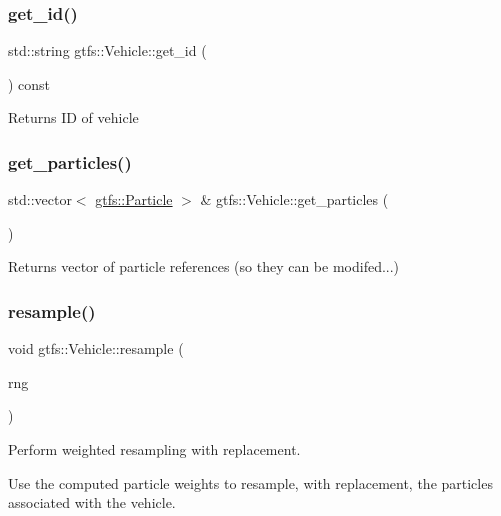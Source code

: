 \subsubsection{\texorpdfstring{get\+\_\+id()}{get\_id()}}
{\footnotesize\ttfamily std\+::string gtfs\+::\+Vehicle\+::get\+\_\+id (\begin{DoxyParamCaption}{ }\end{DoxyParamCaption}) const}

\begin{DoxyReturn}{Returns}
ID of vehicle 
\end{DoxyReturn}
\mbox{\label{classgtfs_1_1Vehicle_a7b12b079c68880f00f532ca25858c368}} 
\subsubsection{\texorpdfstring{get\+\_\+particles()}{get\_particles()}}
{\footnotesize\ttfamily std\+::vector$<$ \hyperlink{classgtfs_1_1Particle}{gtfs\+::\+Particle} $>$ \& gtfs\+::\+Vehicle\+::get\+\_\+particles (\begin{DoxyParamCaption}{ }\end{DoxyParamCaption})}

\begin{DoxyReturn}{Returns}
vector of particle references (so they can be modifed...) 
\end{DoxyReturn}
\mbox{\label{classgtfs_1_1Vehicle_a8367fc70a64b7e596422f880dbff1193}} 
\subsubsection{\texorpdfstring{resample()}{resample()}}
{\footnotesize\ttfamily void gtfs\+::\+Vehicle\+::resample (\begin{DoxyParamCaption}\item[{\hyperlink{classsampling_1_1RNG}{sampling\+::\+R\+NG} \&}]{rng }\end{DoxyParamCaption})}

Perform weighted resampling with replacement.

Use the computed particle weights to resample, with replacement, the particles associated with the vehicle. 

